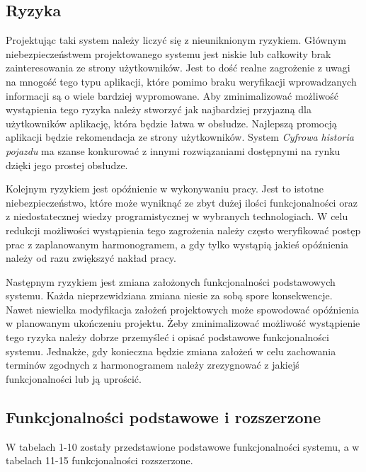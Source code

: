 \documentclass[12pt]{article}
\begin{document}
\subsection{Ryzyka}
Projektując taki system należy liczyć się z nieuniknionym ryzykiem. Głównym niebezpieczeństwem projektowanego systemu jest niskie lub całkowity brak zainteresowania ze strony użytkowników. Jest to dość realne zagrożenie z uwagi na mnogość tego typu aplikacji, które pomimo braku weryfikacji wprowadzanych informacji są o wiele bardziej wypromowane. Aby zminimalizować możliwość wystąpienia tego ryzyka należy stworzyć jak najbardziej przyjazną dla użytkowników aplikację, która będzie łatwa w obsłudze. Najlepszą promocją aplikacji będzie rekomendacja ze strony użytkowników. System \textit{ Cyfrowa historia pojazdu} ma szanse konkurować z innymi rozwiązaniami dostępnymi na rynku dzięki jego prostej obsłudze.

Kolejnym ryzykiem jest opóźnienie w wykonywaniu pracy. Jest to istotne niebezpieczeństwo, które może wyniknąć ze zbyt dużej ilości funkcjonalności oraz z niedostatecznej wiedzy programistycznej w wybranych technologiach. W celu redukcji możliwości wystąpienia tego zagrożenia należy często weryfikować postęp prac z zaplanowanym harmonogramem, a gdy tylko wystąpią jakieś opóźnienia należy od razu zwiększyć nakład pracy.

Następnym ryzykiem jest zmiana założonych funkcjonalności podstawowych systemu. Każda nieprzewidziana zmiana niesie za sobą spore konsekwencje. Nawet niewielka modyfikacja założeń projektowych może spowodować opóźnienia w planowanym ukończeniu projektu. Żeby zminimalizować możliwość wystąpienie tego ryzyka należy dobrze przemyśleć i opisać podstawowe funkcjonalności systemu. Jednakże, gdy konieczna będzie zmiana założeń w celu zachowania terminów zgodnych z harmonogramem należy zrezygnować z jakiejś funkcjonalności lub ją uprościć.

\subsection{Funkcjonalności podstawowe i rozszerzone}

W tabelach 1-10 zostały przedstawione podstawowe funkcjonalności systemu, a w tabelach 11-15 funkcjonalności rozszerzone.
\end{document}
